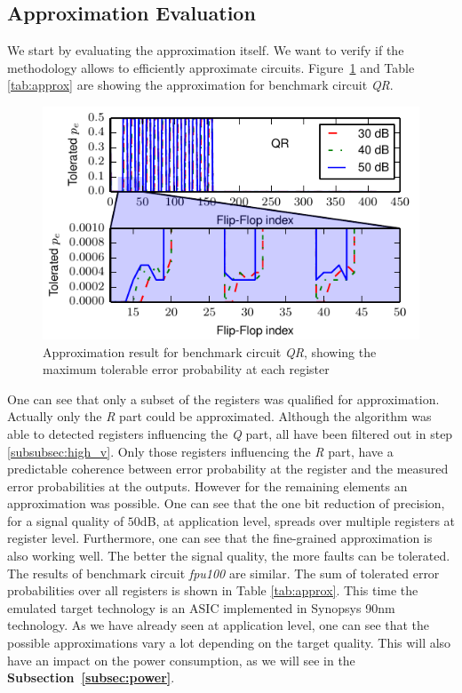\documentclass[10pt,twocolumn]{IEEEtran} %
\begin{document}
\subsection{\bf{Approximation Evaluation}}
We start by evaluating the approximation itself. We want to verify if the methodology allows to efficiently approximate circuits.
Figure~\ref{fig:optimization_qr} and Table \ref{tab:approx} are showing the approximation for benchmark circuit \emph{QR}. 
\begin{figure}[htb]
  \centering
  \includegraphics[width=.48\textwidth]{figs/optimization_qr}
  \caption{Approximation result for benchmark circuit \emph{QR}, showing the maximum tolerable error probability at each register}
  \label{fig:optimization_qr}
\end{figure}
One can see that only a subset of the registers was qualified for approximation. Actually only the \emph{R} part could be approximated. Although the algorithm was able to detected registers influencing the \emph{Q} part, all have been filtered out in step {\ref{subsubsec:high_v}}. Only those registers influencing the \emph{R} part, have a predictable coherence between error probability at the register and the measured error probabilities at the outputs. However for the remaining elements an approximation was possible. One can see that the one bit reduction of precision, for a signal quality of $50$dB, at application level, spreads over multiple registers at register level. Furthermore, one can see that the fine-grained approximation is also working well. The better the signal quality, the more faults can be tolerated.
The results of benchmark circuit \emph{fpu100} are similar. The sum of tolerated error probabilities over all registers is shown in Table \ref{tab:approx}. This time the emulated target technology is an ASIC implemented in Synopsys 90nm technology. As we have already seen at application level, one can see that the possible approximations vary a lot depending on the target quality. This will also have an impact on the power consumption, as we will see in the {\bf Subsection~\ref{subsec:power}}.
\end{document}
